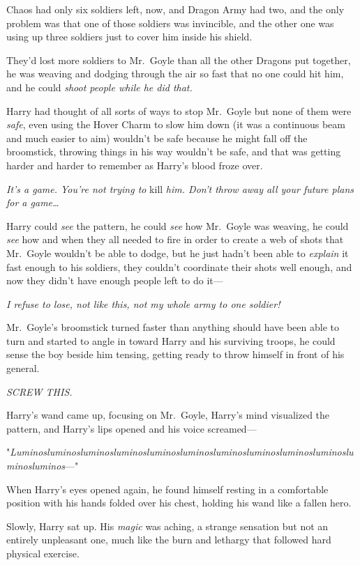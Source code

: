 Chaos had only six soldiers left, now, and Dragon Army had two, and the only 
problem was that one of those soldiers was invincible, and the other one was 
using up three soldiers just to cover him inside his shield.

They'd lost more soldiers to Mr.~Goyle than all the other Dragons put together, 
he was weaving and dodging through the air so fast that no one could hit him, 
and he could \emph{shoot people while he did that.}

Harry had thought of all sorts of ways to stop Mr.~Goyle but none of them were 
\emph{safe}, even using the Hover Charm to slow him down (it was a continuous 
beam and much easier to aim) wouldn't be safe because he might fall off the 
broomstick, throwing things in his way wouldn't be safe, and that was getting 
harder and harder to remember as Harry's blood froze over.

\emph{It's a game. You're not trying to} kill\emph{ him. Don't throw away all 
your future plans for a game{\ldots}}

Harry could \emph{see} the pattern, he could \emph{see} how Mr.~Goyle was 
weaving, he could \emph{see} how and when they all needed to fire in order to 
create a web of shots that Mr.~Goyle wouldn't be able to dodge, but he just 
hadn't been able to \emph{explain} it fast enough to his soldiers, they 
couldn't coordinate their shots well enough, and now they didn't have enough 
people left to do it---

\emph{I refuse to lose, not like this, not my whole army to one soldier!}

Mr.~Goyle's broomstick turned faster than anything should have been able to 
turn and started to angle in toward Harry and his surviving troops, he could 
sense the boy beside him tensing, getting ready to throw himself in front of 
his general.

\emph{SCREW THIS.}

Harry's wand came up, focusing on Mr.~Goyle, Harry's mind visualized the 
pattern, and Harry's lips opened and his voice screamed---

"\emph{Lu\-min\-os\-lu\-min\-os\-lu\-min\-os\-lu\-min\-os\-lu\-min\-os\-lu\-min\-os\-lu\-min\-os\-lu\-min\-os\-lu\-min\-os\-lu\-min\-os\-lu\-min\-os\-lu\-min\-os}---"

\sbreak
When Harry's eyes opened again, he found himself resting in a comfortable 
position with his hands folded over his chest, holding his wand like a fallen 
hero.

Slowly, Harry sat up. His \emph{magic} was aching, a strange sensation but not 
an entirely unpleasant one, much like the burn and lethargy that followed hard 
physical exercise.

